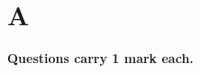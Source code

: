 \documentclass[book,11pt]{IEEEtran}
\renewcommand\thetable{\arabic{table}}
\begin{document}
\maketitle

\newpage


\bigskip

\renewcommand{\thefigure}{\theenumi}
\renewcommand{\thetable}{\theenumi}

%




%
\section{\textbf{A}}
\textbf{Questions carry 1 mark each.}
\end{document}
